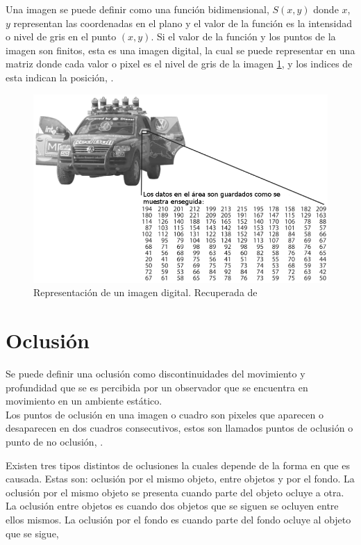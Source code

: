 Una imagen se puede definir como una función bidimensional, $S(x,y)$ donde $x$, $y$ representan las coordenadas en el plano y el valor de la función es la intensidad o nivel de gris en el punto $(x,y)$. 
Si el valor de la función y los puntos de la imagen son finitos, esta es una imagen digital, la cual se puede representar en una matriz donde cada valor o pixel es el nivel de gris de la imagen \ref{fig:image}, y los indices de esta indican la posición, \citep{Gonzalez2002}. 

\begin{figure}[h!]
\begin{center}
\includegraphics[scale=.50]{./Figures/image.png}
\end{center}
\caption{Representación de un imagen digital. Recuperada de \citep{Shin2013}}
\label{fig:image}
\end{figure}

\section{Oclusión}\label{OclusionDef} 

Se puede definir una oclusión como discontinuidades del movimiento y profundidad que se es percibida por un observador que se encuentra en movimiento en un ambiente estático.\\
Los puntos de oclusión en una imagen o cuadro son pixeles que aparecen o desaparecen en dos cuadros consecutivos, estos son llamados puntos de oclusión o punto de no oclusión, \citep{Silva2001}.  

Existen tres tipos distintos de oclusiones la cuales depende de la forma en que es causada. Estas son: oclusión por el mismo objeto, entre objetos y por el fondo. La oclusión por el mismo objeto se presenta cuando parte del objeto ocluye a otra. La oclusión entre objetos es cuando dos objetos que se siguen se ocluyen entre ellos mismos. La oclusión por el fondo es cuando parte del fondo ocluye al objeto que se sigue, \citep{YilmazA.JavedO.andShah2006}


\newpage
